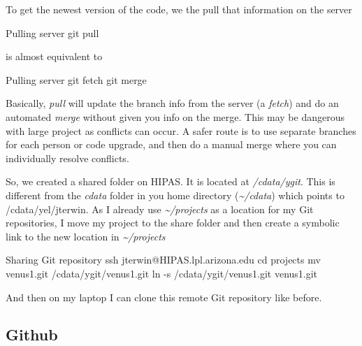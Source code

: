 \documentclass{beamer}
\begin{document}
\begin{frame}
To get the newest version of the code, we the \alert{pull} that information on the server
\begin{block}{Pulling server}
git pull
\end{block}
is almost equivalent to 
\begin{block}{Pulling server}
git fetch \newline
git merge
\end{block}
Basically, \textit{pull} will update the branch info from the server (a \textit{fetch}) and do an automated \textit{merge} without given you info on the merge. This may be dangerous with large project as conflicts can occur. A safer route is to use separate branches for each person or code upgrade, and then do a manual merge where you can individually resolve conflicts.
\end{frame}


\begin{frame}
So, we created a shared folder on HIPAS. It is located at \textit{/cdata/ygit}. This is different from the \textit{cdata} folder in you home directory (\textit{\textasciitilde/cdata}) which points to /cdata/yel/jterwin. As I already use \textit{\textasciitilde/projects} as a location for my Git repositories, I move my project to the share folder and then create a symbolic link to the new location in \textit{\textasciitilde/projects}
\begin{block}{Sharing Git repository}
ssh jterwin@HIPAS.lpl.arizona.edu \newline
cd projects \newline
mv venus1.git /cdata/ygit/venus1.git \newline
ln -s /cdata/ygit/venus1.git venus1.git 
\end{block}
And then on my laptop I can clone this remote Git repository like before.
\end{frame}


%
%
%
\subsection{Github}

\begin{frame}

\end{frame}
\end{document}

